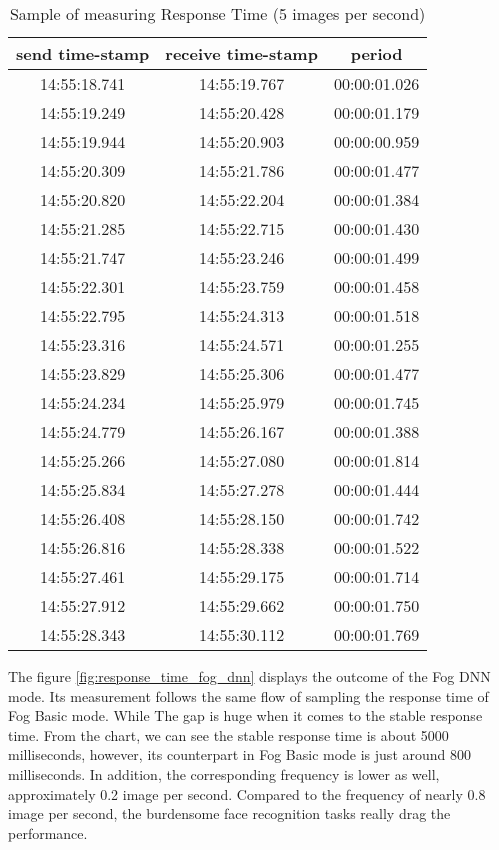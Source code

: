 \begin{table}[h!]
\centering
\begin{tabular}{ |c|c|c| } 
 \hline
 send time-stamp &	receive time-stamp &	period\\
 \hline
14:55:18.741 &	14:55:19.767 &	00:00:01.026\\
14:55:19.249 &	14:55:20.428 &	00:00:01.179\\
14:55:19.944 &	14:55:20.903 &	00:00:00.959\\
14:55:20.309 &	14:55:21.786 &	00:00:01.477\\
14:55:20.820 &	14:55:22.204 &	00:00:01.384\\
14:55:21.285 &	14:55:22.715 &	00:00:01.430\\
14:55:21.747 &	14:55:23.246 &	00:00:01.499\\
14:55:22.301 &	14:55:23.759 &	00:00:01.458\\
14:55:22.795 &	14:55:24.313 &	00:00:01.518\\
14:55:23.316 &	14:55:24.571 &	00:00:01.255\\
14:55:23.829 &	14:55:25.306 &	00:00:01.477\\
14:55:24.234 &	14:55:25.979 &	00:00:01.745\\
14:55:24.779 &	14:55:26.167 &	00:00:01.388\\
14:55:25.266 &	14:55:27.080 &	00:00:01.814\\
14:55:25.834 &	14:55:27.278 &	00:00:01.444\\
14:55:26.408 &	14:55:28.150 &	00:00:01.742\\
14:55:26.816 &	14:55:28.338 &	00:00:01.522\\
14:55:27.461 &	14:55:29.175 &	00:00:01.714\\
14:55:27.912 &	14:55:29.662 &	00:00:01.750\\
14:55:28.343 &	14:55:30.112 &	00:00:01.769\\
 \hline
\end{tabular}
\caption{Sample of measuring Response Time (5 images per second)}
\label{table:measure_response_time}
\end{table}

The figure \ref{fig:response_time_fog_dnn} displays the outcome of the Fog DNN mode. Its measurement follows the same flow of sampling the response time of Fog Basic mode. While The gap is huge when it comes to the stable response time. From the chart, we can see the stable response time is about 5000 milliseconds, however, its counterpart in Fog Basic mode is just around 800 milliseconds. In addition, the corresponding frequency is lower as well, approximately 0.2 image per second. Compared to the frequency of nearly 0.8 image per second, the burdensome face recognition tasks really drag the performance.

